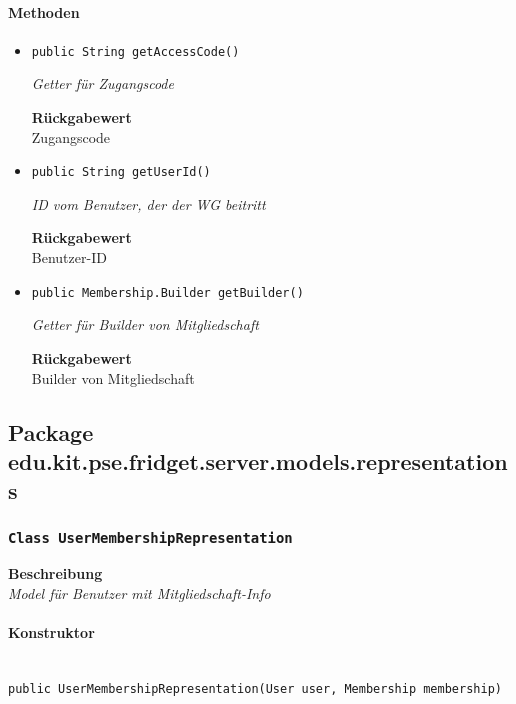      \paragraph*{Methoden}
     \begin{itemize}
     	\item{\texttt{public String getAccessCode()}}
     	
     	\textit{Getter für Zugangscode}
     	
     	
     	
     	\textbf{Rückgabewert} \\
     	Zugangscode        \item{\texttt{public String getUserId()}}
     	
     	\textit{ID vom Benutzer, der der WG beitritt}
     	
     	
     	
     	\textbf{Rückgabewert} \\
     	Benutzer-ID        \item{\texttt{public Membership.Builder getBuilder()}}
     	
     	\textit{Getter für Builder von Mitgliedschaft}
     	
     	
     	
     	\textbf{Rückgabewert} \\
     	Builder von Mitgliedschaft
     \end{itemize}
     \subsection{Package edu.kit.pse.fridget.server.models.representations}
     \subsubsection{\texttt{Class UserMembershipRepresentation}}
     \textbf{Beschreibung} \\
     \textit{Model für Benutzer mit Mitgliedschaft-Info}
     \paragraph*{Konstruktor}\mbox{} \\
     \texttt{public UserMembershipRepresentation(User user, Membership membership)} \\

